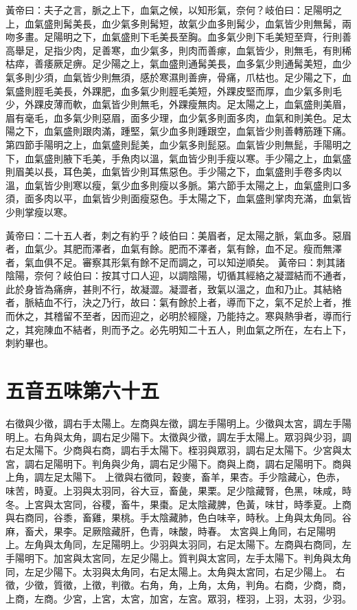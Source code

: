 黃帝曰：夫子之言，脈之上下，血氣之候，以知形氣，奈何？岐伯曰：足陽明之上，血氣盛則髯美長，血少氣多則髯短，故氣少血多則髯少，血氣皆少則無髯，兩吻多畫。足陽明之下，血氣盛則下毛美長至胸。血多氣少則下毛美短至齊，行則善高舉足，足指少肉，足善寒，血少氣多，則肉而善瘃，血氣皆少，則無毛，有則稀枯瘁，善痿厥足痹。足少陽之上，氣血盛則通髯美長，血多氣少則通髯美短，血少氣多則少須，血氣皆少則無須，感於寒濕則善痹，骨痛，爪枯也。足少陽之下，血氣盛則脛毛美長，外踝肥，血多氣少則脛毛美短，外踝皮堅而厚，血少氣多則毛少，外踝皮薄而軟，血氣皆少則無毛，外踝瘦無肉。足太陽之上，血氣盛則美眉，眉有毫毛，血多氣少則惡眉，面多少理，血少氣多則面多肉，血氣和則美色。足太陽之下，血氣盛則跟肉滿，踵堅，氣少血多則踵跟空，血氣皆少則善轉筋踵下痛。第四節手陽明之上，血氣盛則髭美，血少氣多則髭惡。血氣皆少則無髭，手陽明之下，血氣盛則腋下毛美，手魚肉以溫，氣血皆少則手瘦以寒。手少陽之上，血氣盛則眉美以長，耳色美，血氣皆少則耳焦惡色。手少陽之下，血氣盛則手卷多肉以溫，血氣皆少則寒以瘦，氣少血多則瘦以多脈。第六節手太陽之上，血氣盛則口多須，面多肉以平，血氣皆少則面瘦惡色。手太陽之下，血氣盛則掌肉充滿，血氣皆少則掌瘦以寒。

黃帝曰：二十五人者，刺之有約乎？岐伯曰：美眉者，足太陽之脈，氣血多。惡眉者，血氣少。其肥而澤者，血氣有餘。肥而不澤者，氣有餘，血不足。瘦而無澤者，氣血俱不足。審察其形氣有餘不足而調之，可以知逆順矣。
黃帝曰：刺其諸陰陽，奈何？岐伯曰：按其寸口人迎，以調陰陽，切循其經絡之凝澀結而不通者，此於身皆為痛痹，甚則不行，故凝澀。凝澀者，致氣以溫之，血和乃止。其結絡者，脈結血不行，決之乃行，故曰：氣有餘於上者，導而下之，氣不足於上者，推而休之，其稽留不至者，因而迎之，必明於經隧，乃能持之。寒與熱爭者，導而行之，其宛陳血不結者，則而予之。必先明知二十五人，則血氣之所在，左右上下，刺約畢也。

\section{五音五味第六十五}

右徵與少徵，調右手太陽上。左商與左徵，調左手陽明上。少徵與太宮，調左手陽明上。右角與太角，調右足少陽下。太徵與少徵，調左手太陽上。眾羽與少羽，調右足太陽下。少商與右商，調右手太陽下。桎羽與眾羽，調右足太陽下。少宮與太宮，調右足陽明下。判角與少角，調右足少陽下。商與上商，調右足陽明下。商與上角，調左足太陽下。
上徵與右徵同，穀麥，畜羊，果杏。手少陰藏心，色赤，味苦，時夏。上羽與太羽同，谷大豆，畜彘，果栗。足少陰藏腎，色黑，味咸，時冬。上宮與太宮同，谷稷，畜牛，果棗。足太陰藏脾，色黃，味甘，時季夏。上商與右商同，谷黍，畜雞，果桃。手太陰藏肺，色白味辛，時秋。上角與太角同。谷麻，畜犬，果李。足厥陰藏肝，色青，味酸，時春。
太宮與上角同，右足陽明上。左角與太角同，左足陽明上。少羽與太羽同，右足太陽下。左商與右商同，左手陽明下。加宮與太宮同，左足少陽上。質判與太宮同，左手太陽下。判角與太角同，左足少陽下。太羽與太角同，右足太陽上。太角與太宮同，右足少陽上。
右徵，少徵，質徵，上徵，判徵。右角，角，上角，太角，判角。右商，少商，商，上商，左商。少宮，上宮，太宮，加宮，左宮。眾羽，桎羽，上羽，太羽，少羽。

